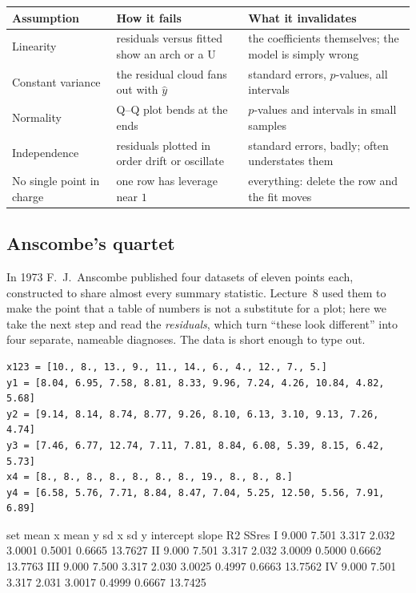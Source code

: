 \documentclass[11pt]{article}
\begin{document}
\begin{center}
\begin{tabular}{@{}lp{5.4cm}p{4.7cm}@{}}
\toprule
\textbf{Assumption} & \textbf{How it fails} & \textbf{What it invalidates}\\
\midrule
Linearity & residuals versus fitted show an arch or a U &
  the coefficients themselves; the model is simply wrong\\[4pt]
Constant variance & the residual cloud fans out with $\hat y$ &
  standard errors, $p$-values, all intervals\\[4pt]
Normality & Q--Q plot bends at the ends &
  $p$-values and intervals in small samples\\[4pt]
Independence & residuals plotted in order drift or oscillate &
  standard errors, badly; often understates them\\[4pt]
No single point in charge & one row has leverage near $1$ &
  everything: delete the row and the fit moves\\
\bottomrule
\end{tabular}
\end{center}

\subsection{Anscombe's quartet}
\label{sec:anscombe}

In 1973 F.\ J.\ Anscombe published four datasets of eleven points each,
constructed to share almost every summary statistic. Lecture~8 used them to
make the point that a table of numbers is not a substitute for a plot; here we
take the next step and read the \emph{residuals}, which turn ``these look
different'' into four separate, nameable diagnoses. The data is short enough to
type out.

\begin{lstlisting}
x123 = [10., 8., 13., 9., 11., 14., 6., 4., 12., 7., 5.]
y1 = [8.04, 6.95, 7.58, 8.81, 8.33, 9.96, 7.24, 4.26, 10.84, 4.82, 5.68]
y2 = [9.14, 8.14, 8.74, 8.77, 9.26, 8.10, 6.13, 3.10, 9.13, 7.26, 4.74]
y3 = [7.46, 6.77, 12.74, 7.11, 7.81, 8.84, 6.08, 5.39, 8.15, 6.42, 5.73]
x4 = [8., 8., 8., 8., 8., 8., 8., 19., 8., 8., 8.]
y4 = [6.58, 5.76, 7.71, 8.84, 8.47, 7.04, 5.25, 12.50, 5.56, 7.91, 6.89]
\end{lstlisting}
\begin{codeout}
set  mean x  mean y   sd x    sd y   intercept  slope    R2      SSres
I     9.000   7.501   3.317   2.032    3.0001  0.5001  0.6665  13.7627
II    9.000   7.501   3.317   2.032    3.0009  0.5000  0.6662  13.7763
III   9.000   7.500   3.317   2.030    3.0025  0.4997  0.6663  13.7562
IV    9.000   7.501   3.317   2.031    3.0017  0.4999  0.6667  13.7425
\end{codeout}
\end{document}
